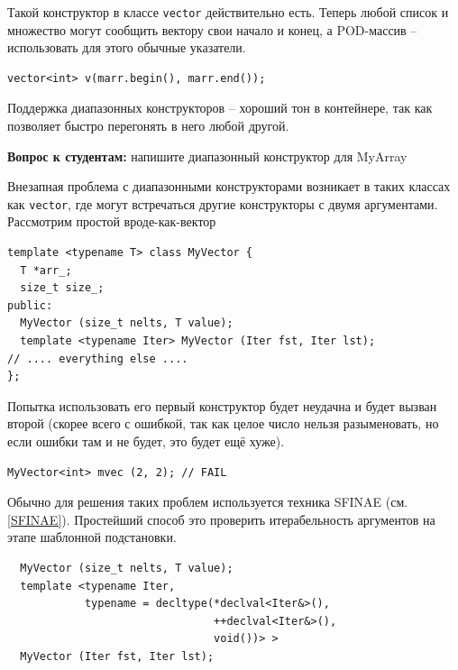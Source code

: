 \documentclass[a4paper,12pt,oneside]{book}
\newif\ifanswers
\begin{document}
Такой конструктор в классе \lstinline!vector! действительно есть. Теперь любой список и множество могут сообщить вектору свои начало и конец, а POD-массив -- использовать для этого обычные указатели.

\begin{lstlisting}
vector<int> v(marr.begin(), marr.end());
\end{lstlisting}

Поддержка диапазонных конструкторов -- хороший тон в контейнере, так как позволяет быстро перегонять в него любой другой.

\textbf{Вопрос к студентам:} напишите диапазонный конструктор для MyArray

\ifanswers
\begin{lstlisting}
template <typename Iter> MyArray (Iter fst, Iter lst) {
  int idx = 0;
  for (auto it = fst; it != lst; ++i) {
    assert (idx < S);
    arr[idx++] = *it;
  }
}
\end{lstlisting}
\fi

Внезапная проблема с диапазонными конструкторами возникает в таких классах как \lstinline!vector!, где могут встречаться другие конструкторы с двумя аргументами. Рассмотрим простой вроде-как-вектор

\begin{lstlisting}
template <typename T> class MyVector {
  T *arr_;
  size_t size_;
public:
  MyVector (size_t nelts, T value);
  template <typename Iter> MyVector (Iter fst, Iter lst);
// .... everything else ....
};
\end{lstlisting}

Попытка использовать его первый конструктор будет неудачна и будет вызван второй (скорее всего с ошибкой, так как целое число нельзя разыменовать, но если ошибки там и не будет, это будет ещё хуже).

\begin{lstlisting}
MyVector<int> mvec (2, 2); // FAIL
\end{lstlisting}

Обычно для решения таких проблем используется техника SFINAE (см. \ref{SFINAE}). Простейший способ это проверить итерабельность аргументов на этапе шаблонной подстановки.

\begin{lstlisting}
  MyVector (size_t nelts, T value);
  template <typename Iter, 
            typename = decltype(*declval<Iter&>(),
                                ++declval<Iter&>(), 
                                void())> >
  MyVector (Iter fst, Iter lst);
\end{lstlisting}
\end{document}
